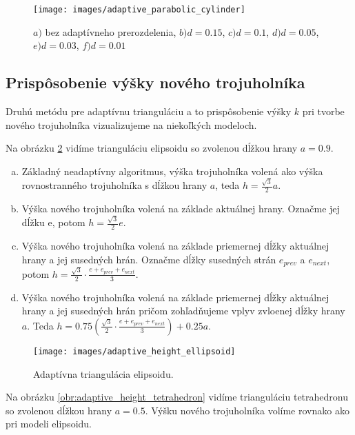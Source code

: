 \begin{figure}
    \centerline{\texttt{[image: images/adaptive\_parabolic\_cylinder]}}
    \caption[Adaptívne prerozdelenie parabolického cylindra.]
    {$a)$ bez adaptívneho prerozdelenia, $b) d=0.15$, $c) d=0.1$, $d) d=0.05$, $e) d=0.03$, $f) d=0.01$}
    \label{obr:adaptive_parabolic_cylinder}
\end{figure}

\subsection{Prispôsobenie výšky nového trojuholníka}
Druhú metódu pre adaptívnu trianguláciu a to prispôsobenie výšky $k$ pri tvorbe nového trojuholníka 
vizualizujeme na niekoľkých modeloch.

Na obrázku \ref{obr:adaptive_height_ellipsoid} vidíme trianguláciu elipsoidu so zvolenou
dĺžkou hrany $a=0.9$.
\begin{enumerate}[a)]
\item{
    Základný neadaptívny algoritmus, výška trojuholníka volená ako výška rovnostranného trojuholníka
    s dĺžkou hrany $a$, teda $h=\frac{\sqrt{3}}{2} a$.
}
\item{
    Výška nového trojuholníka volená na základe aktuálnej hrany. Označme jej dĺžku e, potom  
    $h=\frac{\sqrt{3}}{2} e$.
}
\item{
    Výška nového trojuholníka volená na základe priemernej dĺžky aktuálnej hrany a jej susedných hrán. 
    Označme dĺžky susedných strán $e_{prev}$ a $e_{next}$, potom  
    $h=\frac{\sqrt{3}}{2} \cdot \frac{e+e_{prev}+e_{next}}{3}$.
}
\item{
    Výška nového trojuholníka volená na základe priemernej dĺžky aktuálnej hrany a jej susedných hrán
    pričom zohľadňujeme vplyv zvloenej dĺžky hrany $a$. Teda
    $h=0.75(\frac{\sqrt{3}}{2} \cdot \frac{e+e_{prev}+e_{next}}{3}) + 0.25 a$.
}
\end{enumerate}


\begin{figure}
    \centerline{\texttt{[image: images/adaptive\_height\_ellipsoid]}}
    \caption[Adaptívna triangulácia elipsoidu]
    {Adaptívna triangulácia elipsoidu.}
    \label{obr:adaptive_height_ellipsoid}
\end{figure}

Na obrázku \ref{obr:adaptive_height_tetrahedron} vidíme trianguláciu tetrahedronu so zvolenou
dĺžkou hrany $a=0.5$. Výšku nového trojuholníka volíme rovnako ako pri modeli elipsoidu.

